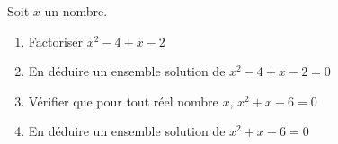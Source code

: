 
Soit $x$ un nombre.
\begin{enumerate}
\item Factoriser $x^2-4+x-2$
\item En déduire un ensemble solution de $x^2-4+x-2=0$
\item Vérifier que pour tout réel nombre $x$, $x^2+x-6=0$
\item En déduire un ensemble solution de $x^2+x-6=0$
\end{enumerate}